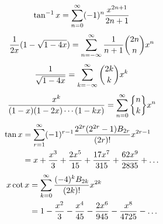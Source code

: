 \begin{equation} \label{eq:power_tan_inv}
    \tan^{-1}x = \bsum (-1)^n \frac{x^{2n+1}}{2n+1}
\end{equation}
\begin{equation} \label{eq:power_catalan_1}
    \frac{1}{2x}(1-\sqrt{1-4x}) = \infsum[n] \frac{1}{n+1} \binom{2n}{n}x^n 
\end{equation}
\begin{equation} \label{eq:power_catalan_2}
    \frac{1}{\sqrt{1-4x}} = \infsum[k] \binom{2k}{k}x^k
\end{equation}
\begin{equation} \label{eq:stSnd}
    \frac{x^k}{(1-x)(1-2x)\cdots (1-kx)} = \bsum \stirlingSnd{n}{k}x^n
\end{equation}
\begin{align} \label{eq:power_tan}
    \tan x &= \sum_{r=1}^\infty (-1)^{r-1}\frac{2^{2r}(2^{2r}-1)B_{2r}}{(2r)!}x^{2r-1} \\
    &=  x + \frac{x^3}{3} + \frac{2x^5}{15} + \frac{17x^7}{315} + \frac{62x^9}{2835} + \ldots \notag
\end{align}
\begin{align} \label{eq:power:xcot}
    x\cot x &= \bsum[k] \frac{(-4)^kB_{2k}}{(2k)!}x^{2k} \\
    &= 1-\frac{x^2}{3} - \frac{x^4}{45} - \frac{2x^6}{945} - \frac{x^8}{4725} - \ldots \notag
\end{align}

